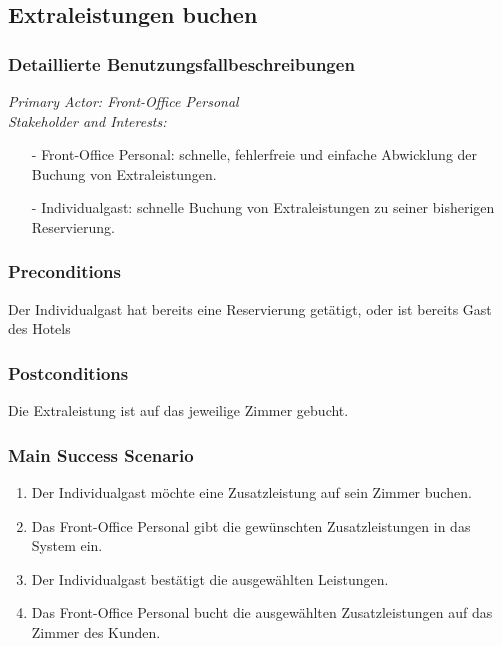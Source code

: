 \documentclass[./detailed_overview_usecases.tex]{subfiles}
\begin{document}
    \subsection{Extraleistungen buchen}
    \subsubsection{Detaillierte Benutzungsfallbeschreibungen}
    \textit{Primary Actor: Front-Office Personal}
    \\
    \textit{Stakeholder and Interests:}
    \begin{itemize}
        \item[-] Front-Office Personal: schnelle, fehlerfreie und einfache Abwicklung der Buchung von Extraleistungen.
        \item[-] Individualgast: schnelle Buchung von Extraleistungen zu seiner bisherigen Reservierung.
    \end{itemize}

    \subsubsection*{Preconditions}
    Der Individualgast hat bereits eine Reservierung getätigt, oder ist bereits Gast des Hotels
    \subsubsection*{Postconditions}
    Die Extraleistung ist auf das jeweilige Zimmer gebucht.

    \subsubsection*{Main Success Scenario}
    \begin{enumerate}
        \item Der Individualgast möchte eine Zusatzleistung auf sein Zimmer buchen.
        \item Das Front-Office Personal gibt die gewünschten Zusatzleistungen in das System ein.
        \item Der Individualgast bestätigt die ausgewählten Leistungen.
        \item Das Front-Office Personal bucht die ausgewählten Zusatzleistungen auf das Zimmer des Kunden.
    \end{enumerate}
\end{document}

